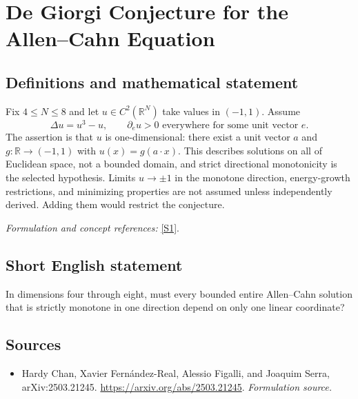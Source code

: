 \documentclass[11pt]{article}
\begin{document}
\section*{\texorpdfstring{De Giorgi Conjecture for the Allen–Cahn Equation}{De Giorgi Conjecture for the Allen–Cahn Equation}}\label{30001256}
\subsection{Definitions and mathematical statement}
Fix $4\le N\le8$ and let $u\in C^2({\mathbb{R}}^N)$ take values in $(-1,1)$. Assume
\[
 \Delta u=u^3-u,\qquad \partial_eu>0\text{ everywhere for some unit vector }e.
\]
The assertion is that $u$ is one-dimensional: there exist a unit vector $a$ and $g:{\mathbb{R}}\to(-1,1)$ with $u(x)=g(a\cdot x)$. This describes solutions on all of Euclidean space, not a bounded domain, and strict directional monotonicity is the selected hypothesis. Limits $u\to\pm1$ in the monotone direction, energy-growth restrictions, and minimizing properties are not assumed unless independently derived. Adding them would restrict the conjecture.
\par\smallskip\textit{Formulation and concept references:} \href{https://arxiv.org/abs/2503.21245}{[S1]}.

\subsection{Short English statement}
In dimensions four through eight, must every bounded entire Allen–Cahn solution that is strictly monotone in one direction depend on only one linear coordinate?
\subsection{Sources}
\begin{itemize}
\item[S1]Hardy Chan, Xavier Fernández-Real, Alessio Figalli, and Joaquim Serra, arXiv:2503.21245.
\url{https://arxiv.org/abs/2503.21245}.
\textit{Formulation source.}
\end{itemize}
\end{document}
